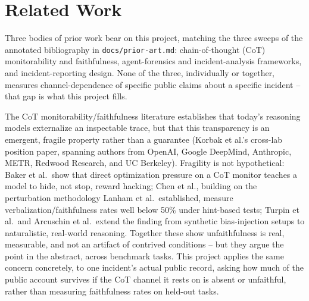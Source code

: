 
\section{Related Work}
\label{sec:related-work}

Three bodies of prior work bear on this project, matching the three sweeps of
the annotated bibliography in \texttt{docs/prior-art.md}: chain-of-thought
(CoT) monitorability and faithfulness, agent-forensics and incident-analysis
frameworks, and incident-reporting design. None of the three, individually or
together, measures channel-dependence of specific public claims about a
specific incident -- that gap is what this project fills.

The CoT monitorability/faithfulness literature establishes that today's
reasoning models externalize an inspectable trace, but that this
transparency is an emergent, fragile property rather than a guarantee
(Korbak et al.'s cross-lab position paper, spanning authors from OpenAI,
Google DeepMind, Anthropic, METR, Redwood Research, and UC Berkeley).
Fragility is not hypothetical: Baker et al.\ show that direct optimization
pressure on a CoT monitor teaches a model to hide, not stop, reward hacking;
Chen et al., building on the perturbation methodology Lanham et al.\
established, measure verbalization/faithfulness rates well below 50\% under
hint-based tests; Turpin et al.\ and Arcuschin et al.\ extend the finding
from synthetic bias-injection setups to naturalistic, real-world reasoning.
Together these show unfaithfulness is real, measurable, and not an artifact
of contrived conditions -- but they argue the point in the abstract, across
benchmark tasks. This project applies the same concern concretely, to one
incident's actual public record, asking how much of the public account
survives if the CoT channel it rests on is absent or unfaithful, rather than
measuring faithfulness rates on held-out tasks.

